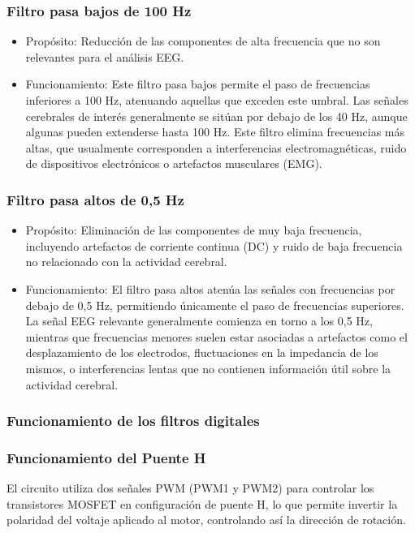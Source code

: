 \documentclass{article}
\begin{document}
\subsubsection{Filtro pasa bajos de 100 Hz}
\begin{itemize}
    \item Propósito: Reducción de las componentes de alta frecuencia que no son relevantes para el análisis EEG.
    \item Funcionamiento: Este filtro pasa bajos permite el paso de frecuencias inferiores a 100 Hz, atenuando aquellas que exceden este umbral. Las señales cerebrales de interés generalmente se sitúan por debajo de los 40 Hz, aunque algunas pueden extenderse hasta 100 Hz. Este filtro elimina frecuencias más altas, que usualmente corresponden a interferencias electromagnéticas, ruido de dispositivos electrónicos o artefactos musculares (EMG).
\end{itemize}
\subsubsection{Filtro pasa altos de 0,5 Hz}
\begin{itemize}
    \item Propósito: Eliminación de las componentes de muy baja frecuencia, incluyendo artefactos de corriente continua (DC) y ruido de baja frecuencia no relacionado con la actividad cerebral.
    \item Funcionamiento: El filtro pasa altos atenúa las señales con frecuencias por debajo de 0,5 Hz, permitiendo únicamente el paso de frecuencias superiores. La señal EEG relevante generalmente comienza en torno a los 0,5 Hz, mientras que frecuencias menores suelen estar asociadas a artefactos como el desplazamiento de los electrodos, fluctuaciones en la impedancia de los mismos, o interferencias lentas que no contienen información útil sobre la actividad cerebral.
\end{itemize}

\subsubsection{Funcionamiento de los filtros digitales}


\subsubsection{Funcionamiento del Puente H}

El circuito utiliza dos señales PWM (PWM1 y PWM2) para controlar los transistores MOSFET en configuración de puente H, lo que permite invertir la polaridad del voltaje aplicado al motor, controlando así la dirección de rotación. 
\end{document}
